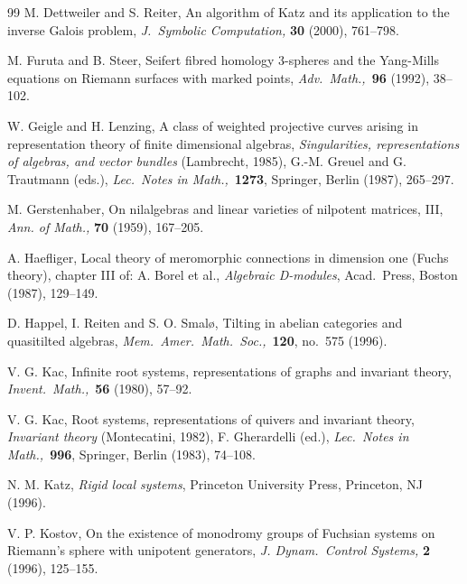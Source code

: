 \documentclass{amsart}
\theoremstyle{plain}
\theoremstyle{definition}
\theoremstyle{remark}
\newcommand{\smalltextsc}[1]{#1}
\begin{document}
\begin{thebibliography}{99}
M. \smalltextsc{Dettweiler} and S. \smalltextsc{Reiter},
An algorithm of Katz and its application to the inverse Galois problem,
\textit{J.\ Symbolic Computation,} \textbf{30} (2000), 761--798.

M. \smalltextsc{Furuta} and B. \smalltextsc{Steer},
Seifert fibred homology 3-spheres and the Yang-Mills equations on Riemann surfaces with marked points,
\textit{Adv.\ Math.,}\ \textbf{96} (1992), 38--102.

W. \smalltextsc{Geigle} and H. \smalltextsc{Lenzing},
A class of weighted projective curves arising in representation theory of finite dimensional algebras,
\textit{Singularities, representations of algebras, and vector bundles} (Lambrecht, 1985),
G.-M. \smalltextsc{Greuel} and G. \smalltextsc{Trautmann} (eds.),
\textit{Lec.\ Notes in Math.,}\ \textbf{1273}, Springer, Berlin (1987), 265--297.

M. \smalltextsc{Gerstenhaber},
On nilalgebras and linear varieties of nilpotent matrices, III,
\textit{Ann. of Math.,} \textbf{70} (1959), 167--205.

A. \smalltextsc{Haefliger},
Local theory of meromorphic connections in dimension one (Fuchs theory),
chapter III of: A. \smalltextsc{Borel} et al., \textit{Algebraic D-modules},
Acad.\ Press, Boston (1987), 129--149.

D. \smalltextsc{Happel}, I. \smalltextsc{Reiten} and S. O. \smalltextsc{Smal\o},
Tilting in abelian categories and quasitilted algebras,
\textit{Mem.\ Amer.\ Math.\ Soc.,}\ \textbf{120}, no.\ 575 (1996).

V. G. \smalltextsc{Kac},
Infinite root systems, representations of graphs and invariant theory,
\textit{Invent.\ Math.,}\ \textbf{56} (1980), 57--92.

V. G. \smalltextsc{Kac},
Root systems, representations of quivers and invariant theory,
\textit{Invariant theory} (Montecatini, 1982),
F. \smalltextsc{Gherardelli} (ed.),
\textit{Lec.\ Notes in Math.,}\ \textbf{996}, Springer, Berlin (1983), 74--108.

N. M. \smalltextsc{Katz},
\textit{Rigid local systems},
Princeton University Press, Princeton, NJ (1996).

V. P. \smalltextsc{Kostov},
On the existence of monodromy groups of Fuchsian systems on Riemann's sphere with unipotent generators,
\textit{J. Dynam.\ Control Systems,} \textbf{2} (1996), 125--155.


\end{thebibliography}
\end{document}
